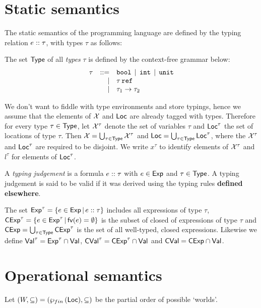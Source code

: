 \documentclass[12pt,a4paper]{report}
\newcommand{\CExp}{\sstyle{CExp}}
\newcommand{\CVal}{\sstyle{CVal}}
\begin{document}

\section{Static semantics}

The static semantics of the programming language are defined by the typing relation
${e}\mathrel{::}{\tau}$, with types $\tau$ as follows:

\begin{definition}[Types]
  The set $\mathsf{Type}$ of all {\em types} $\tau$ is defined by the context-free grammar below:
  \[\begin{array}{rrlll}
    \tau  & ::= & \mathtt{bool} \,\mid\, \mathtt{int} \,\mid\, \mathtt{unit}
          \\ & \mid & \tau\,\mathtt{ref}
          \\ & \mid & \tau_1\to\tau_2
  \end{array}\]
\end{definition}

We don't want to fiddle with type environments and store typings, hence we assume that
the elements of $\mathcal{X}$ and $\mathsf{Loc}$ are already tagged with types. Therefore for every
type $\tau\in\mathsf{Type}$, let $\mathcal{X}^\tau$ denote the set of variables $\tau$ and $\mathsf{Loc}^\tau$ the
set of locations of type $\tau$. Then $\mathcal{X}=\bigcup_{\tau\in\mathsf{Type}}\mathcal{X}^\tau$ and
$\mathsf{Loc}=\bigcup_{\tau\in\mathsf{Type}}\mathsf{Loc}^\tau$, where the $\mathcal{X}^\tau$ and $\mathsf{Loc}^\tau$ are
required to be disjoint. We write $x^\tau$ to identify elements of $\mathcal{X}^\tau$ and
$l^\tau$ for elements of $\mathsf{Loc}^\tau$.

\begin{definition}
  A {\em typing judgement} is a formula ${e}\mathrel{::}{\tau}$ with
  $e\in\mathsf{Exp}$ and $\tau\in\mathsf{Type}$. A typing judgement is said to
  be valid if it was derived using the typing rules {\bf defined
  elsewhere}.
\end{definition}

The set $\mathsf{Exp}^\tau = \{e\in\mathsf{Exp}\,|\,{e}\mathrel{::}{\tau}\}$ includes all expressions of type $\tau$,
$\CExp^\tau = \{e\in\Exp^\tau\,|\,\fv{e}=\emptyset\}$ is the subset of closed of expressions of
type $\tau$ and $\CExp = \bigcup_{\tau\in\Type} \CExp^\tau$ is the set of all well-typed, closed
expressions. Likewise we define $\mathsf{Val}^\tau = \mathsf{Exp}^\tau\cap\mathsf{Val}$, $\CVal^\tau = \CExp^\tau \cap \Val$
and $\CVal = \CExp \cap \Val$.



\section{Operational semantics}

Let $(W,\subseteq) = (\wp_{fin}\,(\mathsf{Loc}),\subseteq)$ be the partial order of possible `worlds'.
\end{document}
